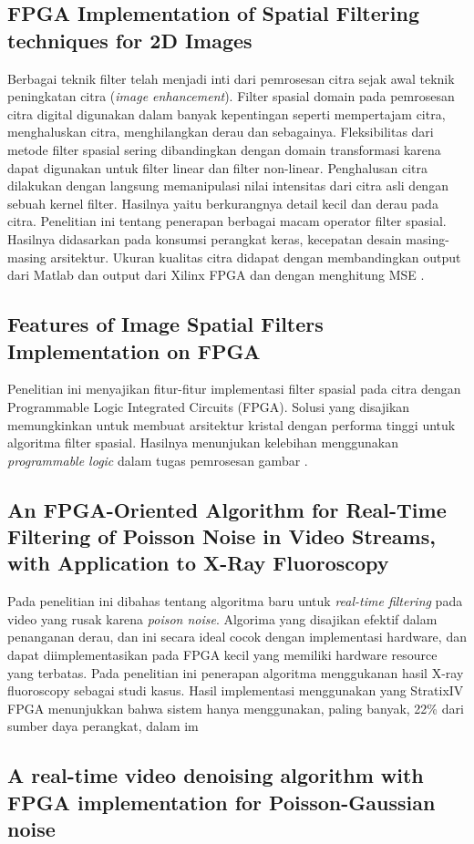 \subsection{FPGA Implementation of Spatial Filtering techniques for 2D Images}
Berbagai teknik filter telah menjadi inti dari pemrosesan citra sejak awal teknik peningkatan citra (\textit{image enhancement}). Filter spasial domain pada pemrosesan citra digital digunakan dalam banyak kepentingan seperti mempertajam citra, menghaluskan citra, menghilangkan derau dan sebagainya. Fleksibilitas dari metode filter spasial sering dibandingkan dengan domain transformasi karena dapat digunakan untuk filter linear dan filter non-linear. Penghalusan citra dilakukan dengan langsung memanipulasi nilai intensitas dari citra asli dengan sebuah kernel filter. Hasilnya yaitu berkurangnya detail kecil dan derau pada citra. Penelitian ini tentang penerapan berbagai macam operator filter spasial. Hasilnya didasarkan pada konsumsi perangkat keras, kecepatan desain masing-masing arsitektur. Ukuran kualitas citra didapat dengan membandingkan output dari Matlab dan output dari Xilinx FPGA dan dengan menghitung MSE .

\subsection{Features of Image Spatial Filters Implementation on FPGA}
Penelitian ini menyajikan fitur-fitur implementasi filter spasial pada citra dengan Programmable Logic Integrated Circuits (FPGA). Solusi yang disajikan memungkinkan untuk membuat arsitektur kristal dengan performa tinggi untuk algoritma filter spasial. Hasilnya menunjukan kelebihan menggunakan \textit{programmable logic} dalam tugas pemrosesan gambar .

\subsection{An FPGA-Oriented Algorithm for Real-Time Filtering of Poisson Noise in Video Streams, with Application to X-Ray Fluoroscopy}
Pada penelitian ini dibahas tentang algoritma baru untuk \textit{real-time filtering} pada video yang rusak karena \textit{poison noise}. Algorima yang disajikan efektif dalam penanganan derau, dan ini secara ideal cocok dengan implementasi hardware, dan dapat diimplementasikan pada FPGA kecil yang memiliki hardware resource yang terbatas. Pada penelitian ini penerapan algoritma menggukanan hasil X-ray fluoroscopy sebagai studi kasus. Hasil implementasi menggunakan yang StratixIV FPGA menunjukkan bahwa sistem hanya menggunakan, paling banyak, 22\% dari sumber daya perangkat, dalam im 

\subsection{A real-time video denoising algorithm with FPGA implementation for Poisson-Gaussian noise}
